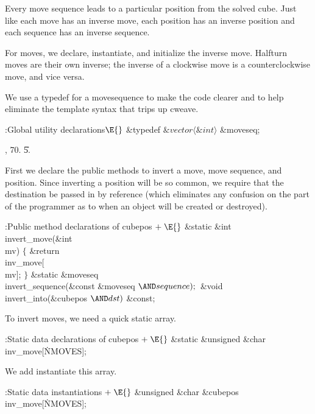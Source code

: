 Every move sequence leads to a particular position from the solved
cube.  Just like each move has an inverse move, each position has an
inverse position and each sequence has an inverse sequence.

For moves, we declare, instantiate, and initialize the inverse move.
Halfturn moves are their own inverse; the inverse of a clockwise move
is a counterclockwise move, and vice versa.

We use a typedef for a movesequence to make the code clearer and
to help eliminate the template syntax that trips up cweave.

\Y\B\4:Global utility declarations\X${}\E{}$\6
\&{typedef} ${}\&{vector}\langle\&{int}\rangle{}$ \&{moveseq};\par
{}, 70.
\U5.\fi

First we declare the public methods to invert a move, move sequence,
and position.  Since inverting a position will be so common, we
require that the destination be passed in by reference (which
eliminates any confusion on the part of the programmer as to when
an object will be created or destroyed).

\Y\B\4:Public method declarations of cubepos\X${}\mathrel+\E{}$\6
\&{static} \&{int} \\{invert\_move}(\&{int} \\{mv})\1\1\2\2\6
${}\{{}$\1\6
\&{return} \\{inv\_move}[\\{mv}];\6
\4${}\}{}$\2\7
\&{static} \&{moveseq} \\{invert\_sequence}(\&{const} \&{moveseq} ${}{\AND}%
\\{sequence});{}$\6
\&{void} \\{invert\_into}(\&{cubepos} ${}{\AND}\\{dst}){}$ \&{const};\par
\fi

To invert moves, we need a quick static array.

\Y\B\4:Static data declarations of cubepos\X${}\mathrel+\E{}$\6
\&{static} \&{unsigned} \&{char} \\{inv\_move}[\.{NMOVES}];\par
\fi

We add instantiate this array.

\Y\B\4:Static data instantiations\X${}\mathrel+\E{}$\6
\&{unsigned} \&{char} \&{cubepos}\DC\\{inv\_move}[\.{NMOVES}];\par
\fi

